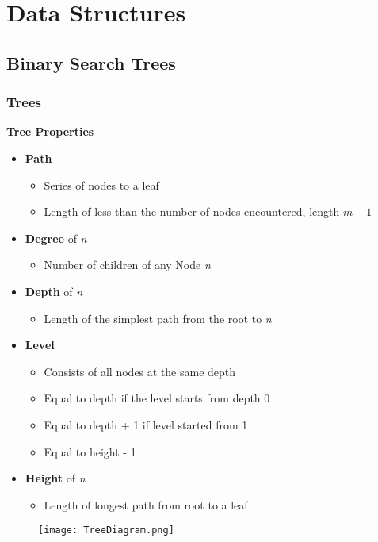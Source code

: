 \documentclass[10pt, 
a4paper, 
oneside, 
headinclude, footinclude, 
BCOR5mm]
{scrartcl}
\begin{document}
\section{Data Structures}
\subsection{Binary Search Trees}
\subsubsection{Trees}
\textbf{Tree Properties}
\begin{itemize}
    \item \textbf{Path}
    \begin{itemize}
        \item Series of nodes to a leaf
        \item Length of less than the number of nodes encountered, length $m-1$
    \end{itemize}
    \item \textbf{Degree} of \textit{n}
    \begin{itemize}
        \item Number of children of any Node \textit{n}
    \end{itemize}
    \item \textbf{Depth} of \textit{n}
    \begin{itemize}
        \item Length of the simplest path from the root to \textit{n}
    \end{itemize}
    \item \textbf{Level}
    \begin{itemize}
        \item Consists of all nodes at the same depth
        \item Equal to depth if the level starts from depth 0
        \item Equal to depth + 1 if level started from 1
        \item Equal to height - 1
    \end{itemize}
    \item \textbf{Height} of \textit{n}
    \begin{itemize}
        \item Length of longest path from root to a leaf
    \end{itemize}
\end{itemize}
\begin{figure}[H]
    \begin{center}
        \texttt{[image: TreeDiagram.png]}
    \end{center}
\end{figure}
\end{document}
